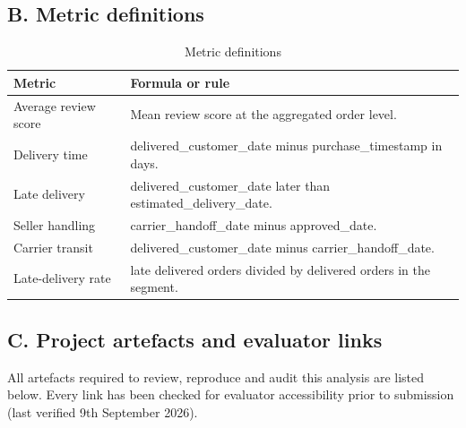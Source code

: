 \documentclass[11pt,a4paper]{article}
\begin{document}
\subsection*{B. Metric definitions}

\begin{table}[h]
\centering
\caption{Metric definitions}
\begin{tabularx}{\textwidth}{L{4.0cm} L{9.5cm}}
\toprule
\textbf{Metric} & \textbf{Formula or rule} \\
\midrule
Average review score & Mean review score at the aggregated order level. \\
Delivery time & delivered\_customer\_date minus purchase\_timestamp in days. \\
Late delivery & delivered\_customer\_date later than estimated\_delivery\_date. \\
Seller handling & carrier\_handoff\_date minus approved\_date. \\
Carrier transit & delivered\_customer\_date minus carrier\_handoff\_date. \\
Late-delivery rate & late delivered orders divided by delivered orders in the segment. \\
\bottomrule
\end{tabularx}
\end{table}

\subsection*{C. Project artefacts and evaluator links}

All artefacts required to review, reproduce and audit this analysis are listed below. Every link has been checked for evaluator accessibility prior to submission (last verified 9th September 2026).
\end{document}
